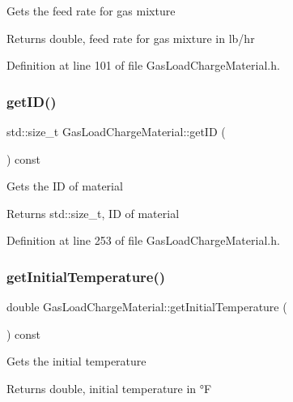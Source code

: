 Gets the feed rate for gas mixture \begin{DoxyReturn}{Returns}
double, feed rate for gas mixture in lb/hr 
\end{DoxyReturn}


Definition at line 101 of file Gas\+Load\+Charge\+Material.\+h.

\mbox{\label{class_gas_load_charge_material_a32dc0d73857ebe4322cf525064713cf6}} 
\subsubsection{\texorpdfstring{get\+I\+D()}{getID()}}
{\footnotesize\ttfamily std\+::size\+\_\+t Gas\+Load\+Charge\+Material\+::get\+ID (\begin{DoxyParamCaption}{ }\end{DoxyParamCaption}) const\hspace{0.3cm}{\ttfamily [inline]}}

Gets the ID of material \begin{DoxyReturn}{Returns}
std\+::size\+\_\+t, ID of material 
\end{DoxyReturn}


Definition at line 253 of file Gas\+Load\+Charge\+Material.\+h.

\mbox{\label{class_gas_load_charge_material_af8a83c3720d108baa196394105822db7}} 
\subsubsection{\texorpdfstring{get\+Initial\+Temperature()}{getInitialTemperature()}}
{\footnotesize\ttfamily double Gas\+Load\+Charge\+Material\+::get\+Initial\+Temperature (\begin{DoxyParamCaption}{ }\end{DoxyParamCaption}) const\hspace{0.3cm}{\ttfamily [inline]}}

Gets the initial temperature \begin{DoxyReturn}{Returns}
double, initial temperature in °F 
\end{DoxyReturn}


